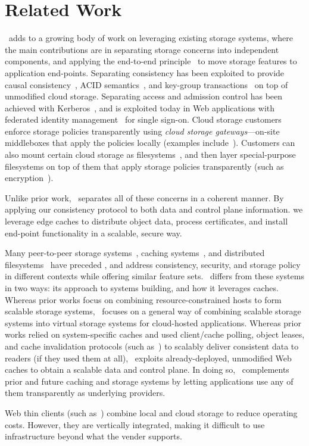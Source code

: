 \section{Related Work}
\label{sec:related}

\Syndicate\ adds to a growing body of work on leveraging existing
storage systems, where the main contributions are in separating storage 
concerns into independent components, and applying the end-to-end
principle~\cite{end-to-end} to move storage features to application end-points.
Separating consistency has been exploited
to provide causal consistency~\cite{bolt-on-causal-consistency},
ACID semantics~\cite{deuteronomy}, and key-group transactions~\cite{g-store,scatter} on
top of unmodified cloud storage.  Separating access and admission control 
has been achieved with Kerberos~\cite{kerberos}, and is
exploited today in Web applications with federated identity 
management~\cite{openid,oauth,shibboleth} for single sign-on.
Cloud storage customers enforce storage policies transparently using
{\it cloud storage gateways}---on-site middleboxes that apply the policies
locally (examples include~\cite{riverbed-gateway, amazon-gateway, twinstrata-gateway}).
Customers can also mount certain cloud storage as filesystems~\cite{dropbox,s3fs},
and then layer special-purpose filesystems on top of them that apply 
storage policies transparently (such as encryption~\cite{encfs}).

Unlike prior work, \Syndicate\ separates all of these concerns in a coherent manner.
By applying our consistency protocol to both data and control plane information.
we leverage edge caches to distribute object data, process
certificates, and install end-point functionality in a scalable, secure way.

Many peer-to-peer storage systems~\cite{oceanstore,bayou,practi,kademlia,chord,pastry,dot},
caching systems~\cite{sloppy-dht,karger99,akamai,breslau99},
and distributed filesystems~\cite{afs,xFS,ceph,wheelfs,farsite,tahoe-lafs,shark,ivy}
have preceded \Syndicate, and address consistency, security, and storage policy
in different contexts while offering similar feature sets.
\Syndicate\ differs from these systems in two ways:  its
approach to systems building, and how it leverages caches.  Whereas prior works focus on
combining resource-constrained hosts to form scalable storage
systems, \Syndicate\ focuses on a general way of combining
scalable storage systems into virtual
storage systems for cloud-hosted applications.
Whereas prior works relied on system-specific caches and used client/cache polling,
object leases, and cache invalidation protocols (such as~\cite{wcdp,Gwertzman96,Liu97,gray89})
to scalably deliver consistent data to readers (if they used them at all), \Syndicate\
exploits already-deployed, unmodified Web caches to obtain a scalable data and control plane.
In doing so, \Syndicate\ complements prior and future caching and storage systems by
letting applications use any of them transparently as underlying providers.

Web thin clients (such as~\cite{chromeos}) combine
local and cloud storage to reduce operating costs.  However, they are vertically integrated,
making it difficult to use infrastructure beyond what the vender supports.